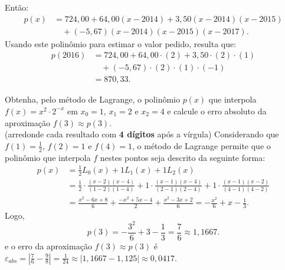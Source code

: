 \documentclass[12pt,a4paper]{article}
\begin{document}
\begin{ExerciseList}
Então:
\begin{align*}
p(x)
&=724,00
 + 64,00 (x-2014)
 +  3,50 (x-2014)(x-2015)\\
&\quad +(-5,67) (x-2014)(x-2015)(x-2017).
\end{align*}
Usando este polinômio para estimar o valor pedido, resulta que:
\begin{align*}
p(2016)
&=724,00
 + 64,00\cdot (2)
 +  3,50\cdot (2)\cdot (1)\\
&\quad +(-5,67)\cdot (2)\cdot (1)\cdot (-1)\\
& = 870,33.
\end{align*}

\Exercise[title={2,5}]
Obtenha, pelo método de Lagrange, o polinômio $p(x)$ que interpola $f(x) = x^2 \cdot 2^{-x}$ em $x_0 = 1$, $x_1 = 2$ e $x_2 = 4$ e calcule o erro absoluto da aproximação $f(3) \approx p(3)$.
\\(arredonde cada resultado com \textbf{4 dígitos} após a vírgula)
\Answer
Considerando que $f(1) = \frac{1}{2}$, $f(2) = 1$ e $f(4) = 1$, o método de Lagrange permite que o polinômio que interpola $f$ nestes pontos seja descrito da seguinte forma:
\begin{align*}
p(x)
& = \frac{1}{2} L_0(x) + 1 L_1(x) + 1 L_2(x) \\
& = \frac{1}{2} \cdot \frac{(x-2)(x-4)}{(1-2)(1-4)}
  + 1 \cdot \frac{(x-1)(x-4)}{(2-1)(2-4)}
  + 1 \cdot \frac{(x-1)(x-2)}{(4-1)(4-2)}\\
& = \frac{x^2 - 6 x + 8}{6}
    + \frac{-x^2 + 5 x - 4}{2}
    + \frac{x^2 - 3 x + 2}{6}
  = -\frac{x^2}{6} + x - \frac{1}{3}.
\end{align*}
Logo,
\[
p(3) = -\frac{3^2}{6} + 3 - \frac{1}{3} = \frac{7}{6} \approx 1,1667.
\]
e o erro da aproximação $f(3) \approx p(3)$ é $\varepsilon_{abs}
= \left|\frac{7}{6} - \frac{9}{8}\right|
= \frac{1}{24}
\approx \left|1,1667 - 1,125\right|
\approx 0,0417$.



\end{ExerciseList}
\end{document}
